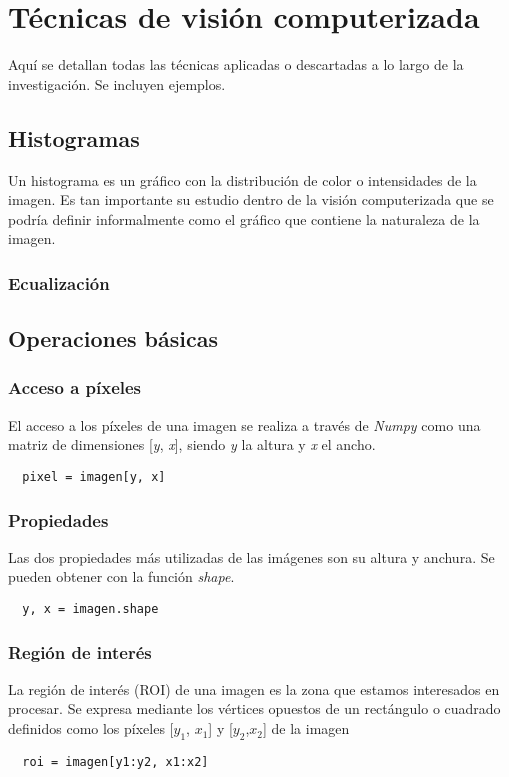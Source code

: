 \chapter{Técnicas de visión computerizada}
Aquí se detallan todas las técnicas aplicadas o descartadas a lo largo
de la investigación. Se incluyen ejemplos.

\section{Histogramas}
Un histograma es un gráfico con la distribución de color o
intensidades de la imagen. Es tan importante su estudio dentro de la
visión computerizada que se podría definir informalmente como el
gráfico que contiene la naturaleza de la imagen.
\subsection{Ecualización}

\section{Operaciones básicas}
\subsection{Acceso a píxeles}
El acceso a los píxeles de una imagen se realiza a través de
\emph{Numpy} como una matriz de dimensiones [\emph{y}, \emph{x}],
siendo \emph{y} la altura y \emph{x} el ancho.
\begin{verbatim}
  pixel = imagen[y, x]
\end{verbatim}

\subsection{Propiedades}
Las dos propiedades más utilizadas de las imágenes son su altura y
anchura.  Se pueden obtener con la función \emph{shape}.
\begin{verbatim}
  y, x = imagen.shape
\end{verbatim}

\subsection{Región de interés}
La región de interés (ROI) de una imagen es la zona que estamos
interesados en procesar. Se expresa mediante los vértices opuestos de
un rectángulo o cuadrado definidos como los píxeles [$y_1$, $x_1$] y
[$y_2$,$x_2$] de la imagen
\begin{verbatim}
  roi = imagen[y1:y2, x1:x2]
\end{verbatim}

